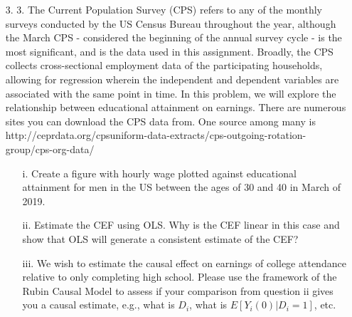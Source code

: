 \documentclass{article}
\begin{document}
\begin{enumerate}
    
    \begin{itemize}
        \item [3.]3. The Current Population Survey (CPS) refers to any of the monthly surveys conducted by the US Census Bureau throughout the year, although the March CPS - considered the beginning of the annual survey cycle - is the most significant, and is the data used in this assignment.
        Broadly, the CPS collects cross-sectional employment data of the participating households, allowing for regression wherein the independent and dependent variables are associated with the same point in time. In this problem, we will explore the relationship between educational attainment on earnings. There are numerous sites you can download the CPS data from. One source among many is http://ceprdata.org/cpsuniform-data-extracts/cps-outgoing-rotation-group/cps-org-data/
        \begin{itemize}
            \item[i.] Create a figure with hourly wage plotted against educational attainment for men in the US between the ages of 30 and 40 in March of 2019.
            \item[ii.] Estimate the CEF using OLS. Why is the CEF linear in this case and show that OLS will generate a consistent estimate of the CEF?
            \item[iii.] We wish to estimate the causal effect on earnings of college attendance relative to only completing high school. Please use the framework of the Rubin Causal Model to assess if your comparison from question ii gives you a causal estimate, e.g., what is \(D_{i}\), what is \(E[Y_{i}(0) | D_{i}=1]\), etc.
        \end{itemize}
    \end{itemize}
\end{enumerate}
\end{document}
